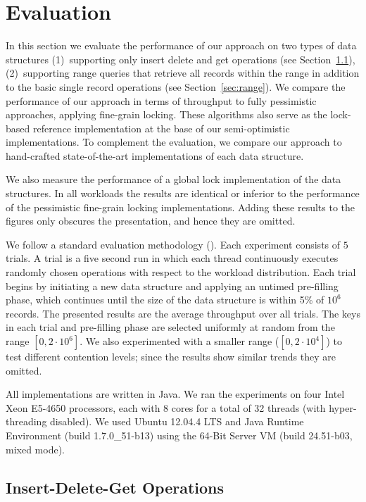\section{Evaluation}
\label{sec:eval}

In this section we evaluate the performance of our approach on two types of data
structures (1)~supporting only insert delete and get operations (see
Section~\ref{sec:readwrite}), (2)~supporting range queries that retrieve all
records within the range in addition to the basic single record operations (see
Section~\ref{sec:range}). We compare the performance of our approach in terms of
throughput to fully pessimistic approaches, applying fine-grain locking. These
algorithms also serve as the lock-based reference implementation at the base of
our semi-optimistic implementations. 
To complement the evaluation, we 
compare our approach to hand-crafted state-of-the-art implementations of each
data structure. 

We also measure the performance of a global lock implementation of the data
structures. In all workloads the results are identical or inferior to the
performance of the pessimistic fine-grain locking implementations. Adding these
results to the figures only obscures the presentation, and hence they are omitted.        

We follow a standard evaluation methodology
(\cite{DrachslerVY2014,NatarajanM2014,BrownER2014,ArbelA2014}). Each experiment
consists of $5$ trials. A trial is a five second run in which each thread continuously executes
randomly chosen operations with respect to the workload distribution. Each trial
begins by initiating a new data structure and applying an untimed pre-filling
phase, which continues until the size of the data structure is within 5\% of
$10^6$ records. The presented results are the average throughput over all trials.    
The keys in each trial and pre-filling phase are selected uniformly at random
from the range $[0,2\cdot10^6]$.
We also experimented with a smaller range ($[0,2\cdot10^4]$) to test different
contention levels; since the results show similar trends they are omitted. 

All implementations are written in Java. We ran the experiments on four Intel
Xeon E5-4650 processors, each with 8 cores for a total of 32 threads 
(with hyper-threading disabled). 
We used Ubuntu 12.04.4 LTS and Java Runtime Environment (build
1.7.0\_51-b13) using the 64-Bit Server VM (build 24.51-b03, mixed mode).

\subsection{Insert-Delete-Get Operations}
\label{sec:readwrite} 

